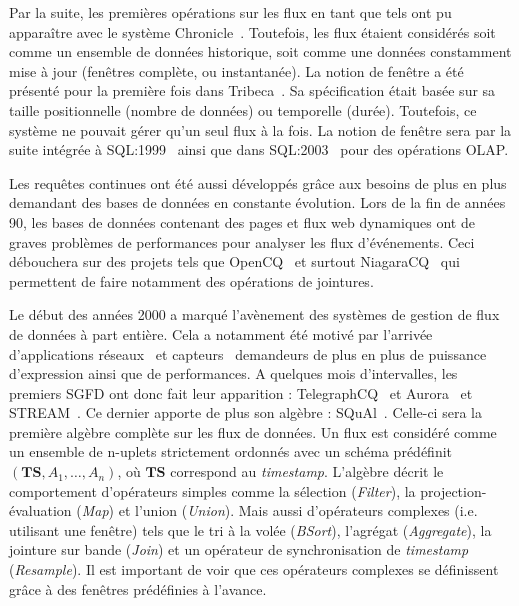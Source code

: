 Par la suite, les premières opérations sur les flux en tant que tels ont pu apparaître avec le système Chronicle~\cite{Jagadish:chronicle}. Toutefois, les flux étaient considérés soit comme un ensemble de données historique, soit comme une données constamment mise à jour (fenêtres complète, ou instantanée). La notion de fenêtre a été présenté pour la première fois dans Tribeca~\cite{Sullivan:tribeca,Sullivan:tribeca2}. Sa spécification était basée sur sa taille positionnelle (nombre de données) ou temporelle (durée). Toutefois, ce système ne pouvait gérer qu'un seul flux à la fois. La notion de fenêtre sera par la suite intégrée à SQL:1999~\cite{Melton:sql1999} ainsi que dans SQL:2003~\cite{Eisenberg:sql2003} pour des opérations OLAP.

Les requêtes continues ont été aussi développés grâce aux besoins de plus en plus demandant des bases de données en constante évolution. Lors de la fin de années 90, les bases de données contenant des pages et flux web dynamiques ont de graves problèmes de performances pour analyser les flux d'événements. Ceci débouchera sur des projets tels que OpenCQ~\cite{Liu:opencq} et surtout NiagaraCQ~\cite{Chen:niagaracq} qui permettent de faire notamment des opérations de jointures.

Le début des années 2000 a marqué l'avènement des systèmes de gestion de flux de données à part entière. Cela a notamment été motivé par l'arrivée d'applications réseaux~\cite{Cranor:gigascope} et capteurs~\cite{Madden:tag,Yao:cougar} demandeurs de plus en plus de puissance d'expression ainsi que de performances. A quelques mois d'intervalles, les premiers SGFD ont donc fait leur apparition : TelegraphCQ~\cite{Chandrasekaran:telegraphcq} et Aurora~\cite{Carney:monitoring} et STREAM~\cite{Widom:queries}. Ce dernier apporte de plus son algèbre : SQuAl~\cite{Abadi:aurora}. Celle-ci sera la première algèbre complète sur les flux de données. Un flux est considéré comme un ensemble de n-uplets strictement ordonnés avec un schéma prédéfinit $(\textbf{TS}, A_1,\dots, A_n)$, où $\textbf{TS}$ correspond au \textit{timestamp}. L'algèbre décrit le comportement d'opérateurs simples comme la sélection (\textit{Filter}), la projection-évaluation (\textit{Map}) et l'union (\textit{Union}). Mais aussi d'opérateurs complexes (i.e. utilisant une fenêtre) tels que le tri à la volée (\textit{BSort}), l'agrégat (\textit{Aggregate}), la jointure sur bande (\textit{Join}) et un opérateur de synchronisation de \textit{timestamp} (\textit{Resample}). Il est important de voir que ces opérateurs complexes se définissent grâce à des fenêtres prédéfinies à l'avance. 

